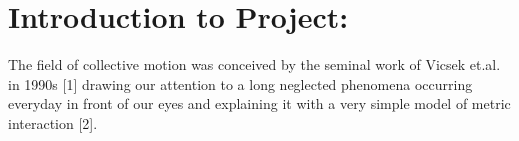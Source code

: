 \documentclass[12pt,a4paper]{article}
\author{Arghyadip Mukherjee , Tapan Goel}
\title{\color{blue}{Modelling mixed-species flocking}}
\date{}
\begin{document}
\maketitle
\section*{Introduction to Project:}

The field of collective motion was conceived by the seminal work of Vicsek et.al. in 1990s [1] drawing our attention to a long neglected phenomena occurring everyday in front of our eyes and explaining it with a very simple model of metric interaction [2].
\end{document}

